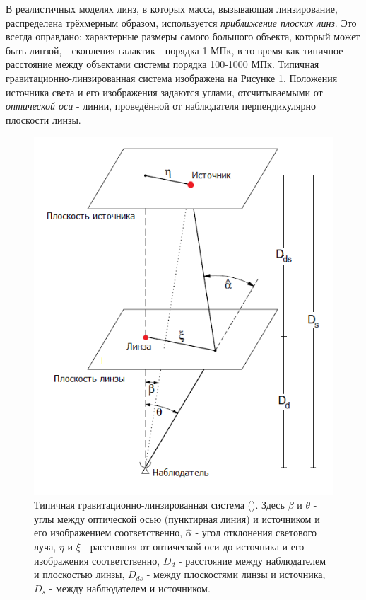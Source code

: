 В реалистичных моделях линз, в которых масса, вызывающая линзирование, распределена трёхмерным образом, используется \textit{приближение плоских линз}. Это всегда оправдано: характерные размеры самого большого объекта, который может быть линзой, - скопления галактик - порядка 1 МПк, в то время как типичное расстояние между объектами системы порядка 100-1000 МПк.
Типичная гравитационно-линзированная система изображена на Рисунке \ref{fig:gravlensfig}. Положения источника света и его изображения задаются углами, отсчитываемыми от \textit{оптической оси} - линии, проведённой от наблюдателя перпендикулярно плоскости линзы.

\begin{figure}[H]
    \centering
	\includegraphics[scale=1.0]{pics/gravlenssyst.png}
	\caption{Типичная гравитационно-линзированная система (\cite{gravlensbook}). Здесь $\beta$ и $\theta$ - углы между оптической осью (пунктирная линия) и источником и его изображением соответственно, $\hat{\alpha}$ - угол отклонения светового луча, $\eta$ и $\xi$ - расстояния от оптической оси до источника и его изображения соответственно,  $D_d$ - расстояние между наблюдателем и плоскостью линзы, $D_{ds}$ - между плоскостями линзы и источника, $D_s$ - между наблюдателем и источником.\label{fig:gravlensfig} }
   \end{figure} 

